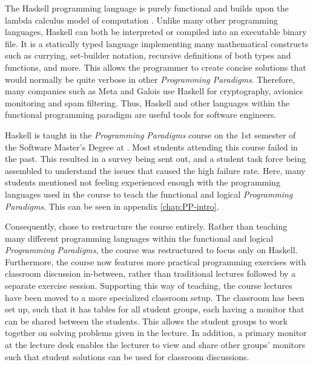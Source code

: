 The Haskell programming language is purely functional\cite{Haskell_landing} and builds upon the lambda calculus model of computation \cite{Haskell_book}.
Unlike many other programming languages, Haskell can both be interpreted or compiled into an executable binary file.
It is a statically typed language implementing many mathematical constructs such as currying, set-builder notation, recursive definitions of both types and functions, and more.
This allows the programmer to create concise solutions that would normally be quite verbose in other \textit{Programming Paradigms}.
Therefore, many companies such as Meta and Galois use Haskell for cryptography, avionics monitoring and spam filtering\cite{Haskell_companies}.
Thus, Haskell and other languages within the functional programming paradigm are useful tools for software engineers.


Haskell is taught in the \textit{Programming Paradigms} course on the 1st semester of the Software Master's Degree at \aau{}.
Most students attending this course failed in the past.
This resulted in a survey being sent out, and a student task force being assembled to understand the issues that caused the high failure rate.
Here, many students mentioned not feeling experienced enough with the programming languages used in the course to teach the functional and logical \textit{Programming Paradigms}. This can be seen in appendix \ref{chap:PP-intro}.


Consequently, \aau{} chose to restructure the course entirely.
Rather than teaching many different programming languages within the functional and logical \textit{Programming Paradigms}, the course was restructured to focus only on Haskell.
Furthermore, the course now features more practical programming exercises with classroom discussion in-between, rather than traditional lectures followed by a separate exercise session.
Supporting this way of teaching, the course lectures have been moved to a more specialized classroom setup. The classroom has been set up, such that it has tables for all student groups, each having a monitor that can be shared between the students. This allows the student groups to work together on solving problems given in the lecture.
In addition, a primary monitor at the lecture desk enables the lecturer to view and share other groups' monitors such that student solutions can be used for classroom discussions.


